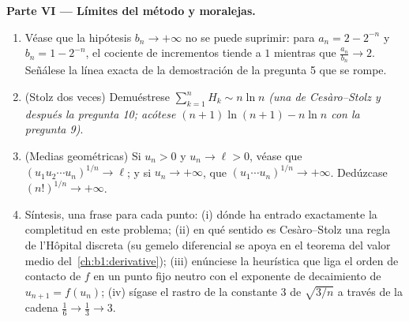 \begin{problem}[{Problema del fin de semana --- el teorema de
Cesàro--Stolz y la asintótica $u_n \sim \sqrt{3/n}$ para
$u_{n+1} = \sin u_n$}]
\medskip
\noindent\textbf{Parte VI --- Límites del método y moralejas.}
\begin{enumerate}[resume]
  \item Véase que la hipótesis $b_n \to +\infty$ no se puede
        suprimir: para $a_n = 2 - 2^{-n}$ y $b_n = 1 - 2^{-n}$, el
        cociente de incrementos tiende a $1$ mientras que
        $\frac{a_n}{b_n} \to 2$. Señálese la línea exacta de la
        demostración de la pregunta 5 que se rompe.
  \item (Stolz dos veces) Demuéstrese $\sum_{k=1}^{n} H_k \sim n \ln n$
        \emph{(una  de Cesàro--Stolz y después la
        pregunta 10; acótese $(n+1)\ln(n+1) - n\ln n$ con la
        pregunta 9)}.
  \item (Medias geométricas) Si $u_n > 0$ y $u_n \to \ell > 0$, véase
        que $(u_1 u_2 \cdots u_n)^{1/n} \to \ell$; y si
        $u_n \to +\infty$, que $(u_1 \cdots u_n)^{1/n} \to +\infty$.
        Dedúzcase $(n!)^{1/n} \to +\infty$.
  \item Síntesis, una frase para cada punto: (i) dónde ha entrado
        exactamente la completitud en este problema; (ii) en qué
        sentido es Cesàro--Stolz una regla de l'Hôpital discreta (su
        gemelo diferencial se apoya en el teorema del valor medio
        del~\cref{ch:b1:derivative}); (iii) enúnciese la heurística
        que liga el orden de contacto de $f$ en un punto fijo neutro
        con el exponente de decaimiento de $u_{n+1} = f(u_n)$;
        (iv) sígase el rastro de la constante $3$ de $\sqrt{3/n}$ a
        través de la cadena $\frac16 \to \frac13 \to 3$.
\end{enumerate}
\end{problem}
